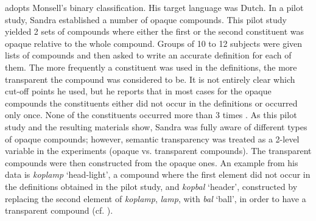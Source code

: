 
\citet{Sandra:1990} adopts Monsell's binary classification.
His target language was Dutch.
In a pilot study, Sandra established a number of opaque compounds. This pilot study yielded 2 sets of compounds where either the first or
the second
constituent was opaque relative to the whole compound.
Groups of 10 to 12 subjects were
      given lists of compounds and then asked to write an accurate
      definition for each of them. The more frequently a constituent was
      used in the definitions, the more transparent the compound was considered
      to be. It is not entirely clear which cut-off points he used,
      but he reports that in most cases for the opaque compounds the
      constituents either did not occur in the definitions or occurred
      only once. None of the constituents occurred more than 3 times
      \citep[537]{Sandra:1990}. As this pilot study and the resulting
      materials show, Sandra was fully aware of different types of
      opaque compounds; however, semantic transparency was 
     treated as a 2-level variable in the experiments (opaque vs.
     transparent compounds).
The transparent compounds were then
      constructed from the opaque ones. 
\enlargethispage{1\baselineskip}
An example from his data is \emph{koplamp} `head-light', a compound where the
      first element did not occur in the definitions obtained in the
      pilot study, and \emph{kopbal} `header', constructed by replacing the
      second element of \emph{koplamp}, \emph{lamp}, with \emph{bal} `ball', in order to have a transparent compound
      (cf. \citealt[543,562]{Sandra:1990}). %

